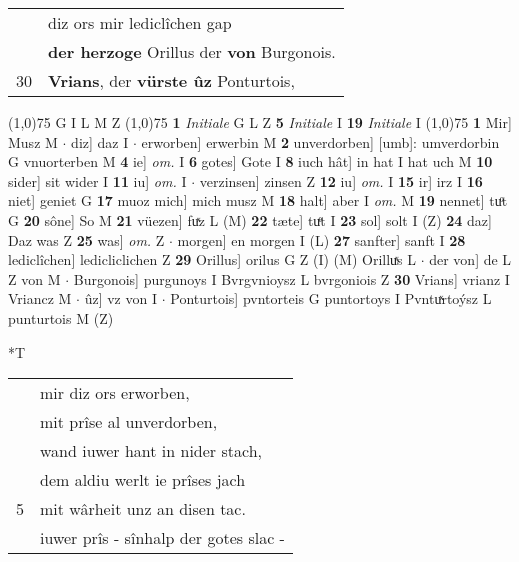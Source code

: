 \documentclass[8pt,a4paper,notitlepage]{article}
\begin{document}
\begin{table}[ht]
\begin{minipage}[t]{0.5\linewidth}
\begin{tabular}{rl}
 & diz ors mir lediclîchen gap\\ 
 & \textbf{der herzoge} Orillus der \textbf{von} Burgonois.\\ 
30 & \textbf{Vrians}, der \textbf{vürste ûz} Ponturtois,\\ 
\end{tabular}
\scriptsize
\line(1,0){75} \newline
G I L M Z \newline
\line(1,0){75} \newline
\textbf{1} \textit{Initiale} G L Z  \textbf{5} \textit{Initiale} I  \textbf{19} \textit{Initiale} I  \newline
\line(1,0){75} \newline
\textbf{1} Mir] Musz M  $\cdot$ diz] daz I  $\cdot$ erworben] erwerbin M \textbf{2} unverdorben] [umb]: umverdorbin G vnuorterben M \textbf{4} ie] \textit{om.} I \textbf{6} gotes] Gote I \textbf{8} iuch hât] in hat I hat uch M \textbf{10} sider] sit wider I \textbf{11} iu] \textit{om.} I  $\cdot$ verzinsen] zinsen Z \textbf{12} iu] \textit{om.} I \textbf{15} ir] irz I \textbf{16} niet] geniet G \textbf{17} muoz mich] mich musz M \textbf{18} halt] aber I \textit{om.} M \textbf{19} nennet] tuͦt G \textbf{20} sône] So M \textbf{21} vüezen] fuͯz L (M) \textbf{22} tæte] tuͤt I \textbf{23} sol] solt I (Z) \textbf{24} daz] Daz was Z \textbf{25} was] \textit{om.} Z  $\cdot$ morgen] en morgen I (L) \textbf{27} sanfter] sanft I \textbf{28} lediclîchen] ledicliclichen Z \textbf{29} Orillus] orilus G Z (I) (M) Orilluͯs L  $\cdot$ der von] de L Z von M  $\cdot$ Burgonois] purgunoys I Bvrgvnioysz L bvrgoniois Z \textbf{30} Vrians] vrianz I Vriancz M  $\cdot$ ûz] vz von I  $\cdot$ Ponturtois] pvntorteis G puntortoys I Pvntuͯrtoýsz L punturtois M (Z) \newline
\end{minipage}
\hspace{0.5cm}
\begin{minipage}[t]{0.5\linewidth}
\small
\begin{center}*T
\end{center}
\begin{tabular}{rl}
 & mir diz ors erworben,\\ 
 & mit prîse al unverdorben,\\ 
 & wand iuwer hant in nider stach,\\ 
 & dem aldiu werlt ie prîses jach\\ 
5 & mit wârheit unz an disen tac.\\ 
 & iuwer prîs - sînhalp der gotes slac -\\ 

\end{tabular}
\end{minipage}
\end{table}
\end{document}

